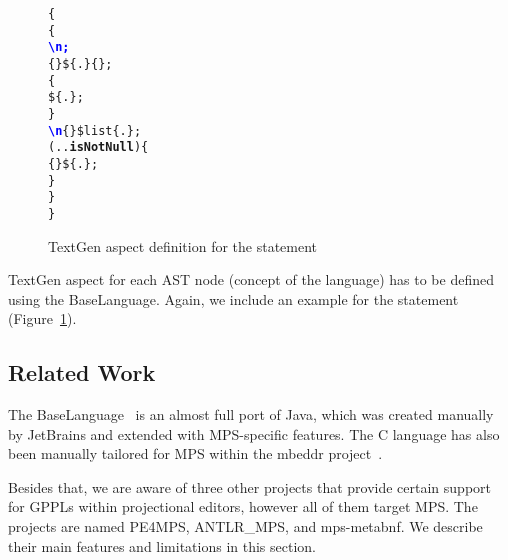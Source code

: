 \begin{figure}[ht]
\centering
\begin{alltt}
\small
{}  \{
   \{
     \textcolor{blue}{\textbf{\textbackslash{}n;}}
     \{\} \$\{.\} \{\mpstgliteral{) \{}\};
     \{
       \$\{.\};
    \}
     \textcolor{blue}{\textbf{\textbackslash{}n}} \{\mpstgliteral{\}}\} \$list\{.\};
     (..\textbf{isNotNull}) \{
       \{ \} \$\{.\};
    \}
  \}
\}
\end{alltt}
\caption{TextGen aspect definition for the  statement}
\label{fig:if_statement_textgen}
\end{figure}

TextGen aspect for each AST node (concept of the language) has to be defined using the BaseLanguage.
Again, we include an example for the  statement (Figure~\ref{fig:if_statement_textgen}).

\subsection{Related Work}
\label{sect:RELATED}


The BaseLanguage~\cite{ref:BASELANG} is an almost full port of Java, which was created manually by JetBrains and extended with MPS-specific features.
The C language has also been manually tailored for MPS within the mbeddr project~\cite{ref:MBEDDR}.

Besides that, we are aware of three other projects that provide certain support for GPPLs within projectional editors, however all of them target MPS.
The projects are named PE4MPS, ANTLR{\_}MPS, and mps-metabnf.
We describe their main features and limitations in this section.

